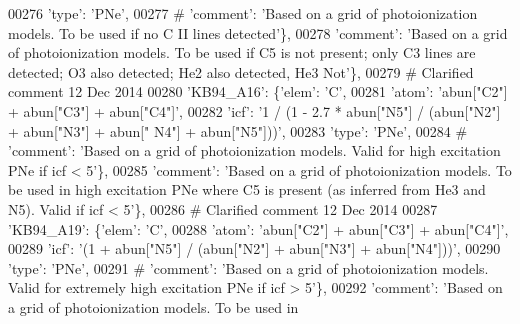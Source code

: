 \begin{DoxyCode}
00276                                       \textcolor{stringliteral}{'type'}: \textcolor{stringliteral}{'PNe'},
00277 \textcolor{comment}{#                                     'comment': 'Based on a grid of photoionization models. To be used if
       no C II lines detected'\},}
00278                                       \textcolor{stringliteral}{'comment'}: \textcolor{stringliteral}{'Based on a grid of photoionization models. To be used if
       C5 is not present; only C3 lines are detected; O3 also detected; He2 also detected, He3 Not'}\},
00279 \textcolor{comment}{# Clarified comment 12 Dec 2014}
00280                          \textcolor{stringliteral}{'KB94\_A16'}: \{\textcolor{stringliteral}{'elem'}: \textcolor{stringliteral}{'C'},
00281                                       \textcolor{stringliteral}{'atom'}: \textcolor{stringliteral}{'abun["C2"] + abun["C3"] + abun["C4"]'},
00282                                       \textcolor{stringliteral}{'icf'}: \textcolor{stringliteral}{'1 / (1 - 2.7 * abun["N5"] / (abun["N2"] + abun["N3"] + abun["
      N4"] + abun["N5"]))'},
00283                                       \textcolor{stringliteral}{'type'}: \textcolor{stringliteral}{'PNe'},
00284 \textcolor{comment}{#                                     'comment': 'Based on a grid of photoionization models. Valid for high
       excitation PNe if icf < 5'\},}
00285                                        \textcolor{stringliteral}{'comment'}: \textcolor{stringliteral}{'Based on a grid of photoionization models. To be used in
       high excitation PNe where C5 is present (as inferred from He3 and N5). Valid if icf < 5'}\},
00286 \textcolor{comment}{# Clarified comment 12 Dec 2014}
00287                          \textcolor{stringliteral}{'KB94\_A19'}: \{\textcolor{stringliteral}{'elem'}: \textcolor{stringliteral}{'C'},
00288                                       \textcolor{stringliteral}{'atom'}: \textcolor{stringliteral}{'abun["C2"] + abun["C3"] + abun["C4"]'},
00289                                       \textcolor{stringliteral}{'icf'}: \textcolor{stringliteral}{'(1 + abun["N5"] / (abun["N2"] + abun["N3"] + abun["N4"]))'},
00290                                       \textcolor{stringliteral}{'type'}: \textcolor{stringliteral}{'PNe'},
00291 \textcolor{comment}{#                                      'comment': 'Based on a grid of photoionization models. Valid for
       extremely high excitation PNe if icf > 5'\},}
00292                                        \textcolor{stringliteral}{'comment'}: \textcolor{stringliteral}{'Based on a grid of photoionization models. To be used in
}
\end{DoxyCode}
